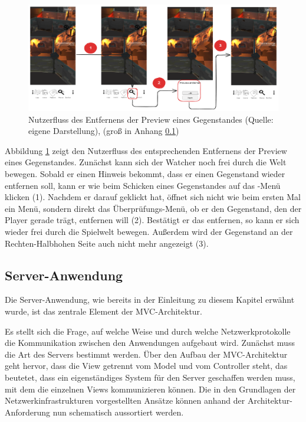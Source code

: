 \begin{figure}[ht]
\centering
\includegraphics[width=1\linewidth]{content/pictures/RemovePreviewFlow.png}
\caption{Nutzerfluss des Entfernens der Preview eines Gegenstandes (Quelle: eigene Darstellung), (groß in Anhang \ref{})}
\label{fig:userflow-remove-preview-cm}
\end{figure}

Abbildung \ref{fig:userflow-remove-preview-cm} zeigt den Nutzerfluss des entsprechenden Entfernens der Preview eines Gegenstandes. Zunächst kann sich der Watcher noch frei durch die Welt bewegen. Sobald er einen Hinweis bekommt, dass er einen Gegenstand wieder entfernen soll, kann er wie beim Schicken eines Gegenstandes auf das -Menü klicken (1). Nachdem er darauf geklickt hat, öffnet sich nicht wie beim ersten Mal ein Menü, sondern direkt das Überprüfungs-Menü, ob er den Gegenstand, den der Player gerade trägt, entfernen will (2). Bestätigt er das entfernen, so kann er sich wieder frei durch die Spielwelt bewegen. Außerdem wird der Gegenstand an der Rechten-Halbhohen Seite auch nicht mehr angezeigt (3). 


\subsection{Server-Anwendung}
Die Server-Anwendung,  wie bereits in der Einleitung zu diesem Kapitel erwähnt wurde, ist das zentrale Element der \ac{MVC}-Architektur.

Es stellt sich die Frage, auf welche Weise und durch welche Netzwerkprotokolle die Kommunikation zwischen den Anwendungen aufgebaut wird. Zunächst muss die Art des Servers bestimmt werden. Über den Aufbau der \ac{MVC}-Architektur geht hervor, dass die View getrennt vom Model und vom Controller steht, das beutetet, dass ein eigenständiges System für den Server geschaffen werden muss, mit dem die einzelnen Views kommunizieren können. Die in den Grundlagen der Netzwerkinfrastrukturen vorgestellten Ansätze können anhand der Architektur-Anforderung nun schematisch aussortiert werden. 

